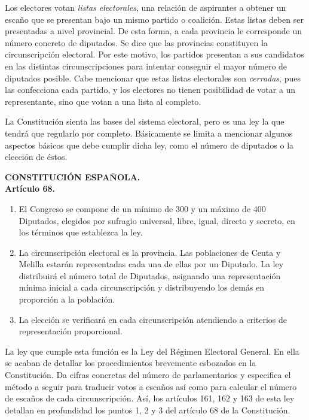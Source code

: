 \documentclass[11pt]{article}
\newcommand\console[1]{{\inconsolata #1}}
\begin{document}
	Los electores votan \textit{listas electorales}, una relación de aspirantes a obtener un escaño que se presentan bajo un mismo partido o coalición. Estas listas deben ser presentadas a nivel provincial. De esta forma, a cada provincia le corresponde un número concreto de diputados. Se dice que las provincias constituyen la circunscripción electoral. Por este motivo, los partidos presentan a sus candidatos en las distintas circunscripciones para intentar conseguir el mayor número de diputados posible. Cabe mencionar que estas listas electorales son \textit{cerradas}, pues las confecciona cada partido, y los electores no tienen posibilidad de votar a un representante, sino que votan a una lista al completo.
	
	La Constitución sienta las bases del sistema electoral, pero es una ley la que tendrá que regularlo por completo. Básicamente se limita a mencionar algunos aspectos básicos que debe cumplir dicha ley, como el número de diputados o la elección de éstos. \\
	
	\console{
		\begin{leftbar}
			\textbf{CONSTITUCIÓN ESPAÑOLA.} \\
			\textbf{Artículo 68.}
			
			\begin{enumerate}
			\item El Congreso se compone de un mínimo de 300 y un máximo de 400 Diputados, elegidos por sufragio universal, libre, igual, directo y secreto, en los términos que establezca la ley.
			\item La circunscripción electoral es la provincia. Las poblaciones de Ceuta y Melilla estarán representadas cada una de ellas por un Diputado. La ley distribuirá el número total de Diputados, asignando una representación mínima inicial a cada circunscripción y distribuyendo los demás en proporción a la población.
			\item La elección se verificará en cada circunscripción atendiendo a criterios de representación proporcional. \\
		\end{enumerate}	
		\end{leftbar}
	}
	
	La ley que cumple esta función es la Ley del Régimen Electoral General. En ella se acaban de detallar los procedimientos brevemente esbozados en la Constitución. Da cifras concretas del número de parlamentarios y especifica el método a seguir para traducir votos a escaños así como para calcular el número de escaños de cada circunscripción. Así, los artículos 161, 162 y 163 de esta ley detallan en profundidad los puntos 1, 2 y 3 del artículo 68 de la Constitución. \\
	
\end{document}
